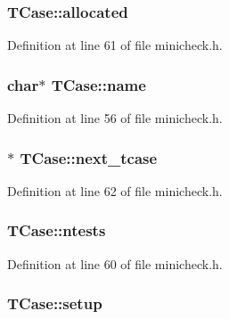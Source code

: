 \subsubsection[{\texorpdfstring{allocated}{allocated}}]{ T\+Case\+::allocated}\hypertarget{struct_t_case_a92481912b4d610eac7f45f563bf9e4d9}{}\label{struct_t_case_a92481912b4d610eac7f45f563bf9e4d9}


Definition at line 61 of file minicheck.\+h.

\subsubsection[{\texorpdfstring{name}{name}}]{\setlength{\rightskip}{0pt plus 5cm}char$\ast$ T\+Case\+::name}\hypertarget{struct_t_case_a112c9a3b3e73275738a789d5f6758c8e}{}\label{struct_t_case_a112c9a3b3e73275738a789d5f6758c8e}


Definition at line 56 of file minicheck.\+h.

\subsubsection[{\texorpdfstring{next\+\_\+tcase}{next_tcase}}]{$\ast$ T\+Case\+::next\+\_\+tcase}\hypertarget{struct_t_case_a8d56f03bc84c7dab23e390902e7992e8}{}\label{struct_t_case_a8d56f03bc84c7dab23e390902e7992e8}


Definition at line 62 of file minicheck.\+h.

\subsubsection[{\texorpdfstring{ntests}{ntests}}]{ T\+Case\+::ntests}\hypertarget{struct_t_case_a9077ace853866e23d4c0d3ef01832994}{}\label{struct_t_case_a9077ace853866e23d4c0d3ef01832994}


Definition at line 60 of file minicheck.\+h.

\subsubsection[{\texorpdfstring{setup}{setup}}]{ T\+Case\+::setup}\hypertarget{struct_t_case_aa9b64bff7661f76f093240b74ad1dbe8}{}\label{struct_t_case_aa9b64bff7661f76f093240b74ad1dbe8}


